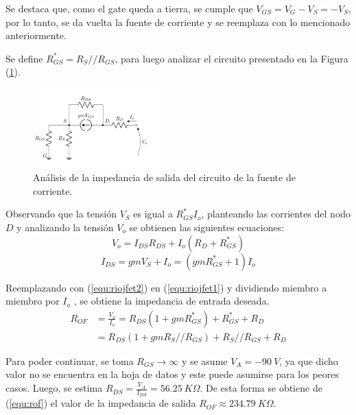 Se destaca que, como el gate queda a tierra, se cumple que $V_{GS} = V_G - V_S = - V_S$, por lo tanto, se da vuelta la fuente de corriente y se reemplaza con lo mencionado anteriormente. 

Se define $R_{GS}^* = R_S // R_{GS}$, para luego analizar el circuito presentado en la Figura (\ref{fig:incfuente2}).
\begin{figure}[H]
\centering
\hspace*{2cm}
	\includegraphics[width=0.45\textwidth, page=2]{Imagenes/ModeloIncremental.pdf}
	\caption{Análisis de la impedancia de salida del circuito de la fuente de corriente.}
\label{fig:incfuente2}
\end{figure}

Observando que la tensión $V_S$ es igual a $R_{GS}^{*} I_o$, planteando las corrientes del nodo $D$ y analizando la tensión $V_o$ se obtienen las siguientes ecuaciones:
\begin{equation}
	V_o = I_{DS} R_{DS} + I_o \left( R_D + R_{GS}^* \right)
	\label{equ:riojfet1}
\end{equation}
\begin{equation}
	I_{DS} = gm V_S + I_o = \left( gm R_{GS}^* + 1 \right) I_o
	\label{equ:riojfet2}
\end{equation}

Reemplazando con (\ref{equ:riojfet2}) en (\ref{equ:riojfet1}) y dividiendo miembro a miembro por $I_o$ , se obtiene la impedancia de entrada deseada.
\begin{equation}
\begin{split}
	R_{OF} & = \frac{V_o}{I_o} = R_{DS} \left( 1 + gm R_{GS}^* \right) + R_{GS}^* + R_D \\
		   & = R_{DS} \left( 1 + gm R_S//R_{GS} \right) + R_S//R_{GS} + R_D
\end{split}
\label{equ:rof}
\end{equation}

Para poder continuar, se toma $R_{GS} \longrightarrow \infty$ y se asume $V_A = -90 \ V$, ya que dicho valor no se encuentra en la hoja de datos y este puede asumirse para los peores casos. Luego, se estima $R_{DS} = \frac{V_A}{I_{DS}} = 56.25 \ K\Omega$. De esta forma se obtiene de (\ref{equ:rof}) el valor de la impedancia de salida $R_{OF} \approx 234.79 \ K\Omega$.

